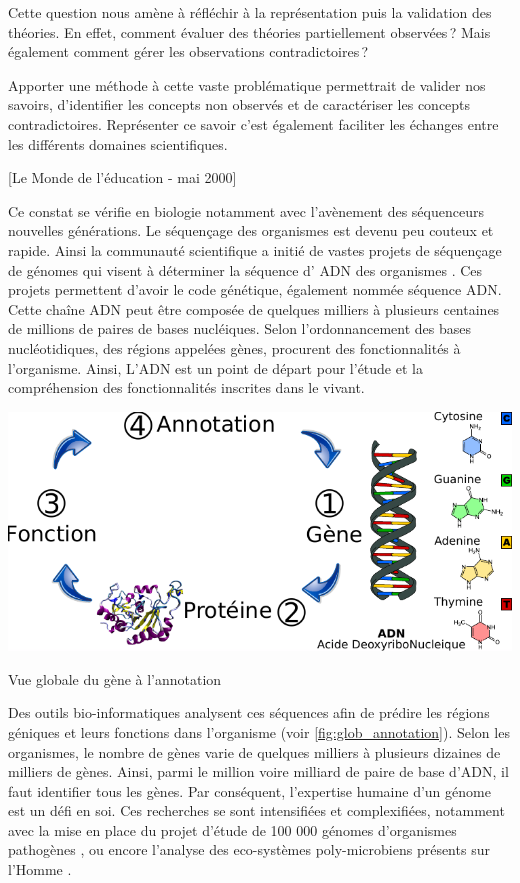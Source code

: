 \begin{refsegment}
Cette question nous amène à réfléchir à la représentation puis la validation des théories. En effet, comment évaluer des théories partiellement observées ? Mais également comment gérer les observations contradictoires ?

Apporter une méthode à cette vaste problématique permettrait de valider nos savoirs, d'identifier les concepts non observés et de caractériser les concepts contradictoires. Représenter ce savoir c'est également faciliter les échanges entre les différents domaines scientifiques.

[Le Monde de l'éducation - mai 2000]

Ce constat se vérifie en biologie notamment avec l'avènement des séquenceurs nouvelles générations. Le séquençage des organismes est devenu peu couteux et rapide. Ainsi la communauté scientifique a initié de vastes projets de séquençage de génomes qui visent à déterminer la séquence d' \gls{ADN} des organismes . Ces projets permettent d'avoir le code génétique, également nommée séquence \gls{ADN}. Cette chaîne \gls{ADN} peut être composée de quelques milliers à plusieurs centaines de millions de paires de bases nucléiques. Selon l'ordonnancement des bases nucléotidiques, des régions appelées gènes, procurent des fonctionnalités à l'organisme. Ainsi, L'\gls{ADN} est un point de départ pour l'étude et la compréhension des fonctionnalités inscrites dans le vivant.


\begin{shadedfigure}
    \centering
    \includegraphics{img/simple_annotation_process.pdf}
    \caption{Vue globale du gène à l'annotation }
    \label{fig:glob_annotation}
\end{shadedfigure}

Des outils bio-informatiques analysent ces séquences afin de prédire les régions géniques et leurs fonctions dans l'organisme (voir \cref{fig:glob_annotation}). Selon les organismes, le nombre de gènes varie de quelques milliers à plusieurs dizaines de milliers de gènes. Ainsi, parmi le million voire milliard de paire de base d'\gls{ADN}, il faut identifier tous les gènes. Par conséquent, l'expertise humaine d'un génome est un défi en soi. Ces recherches se sont intensifiées et complexifiées, notamment avec la mise en place du projet d'étude de 100 000 génomes d'organismes pathogènes \cite{100kfoodborne}, ou encore l'analyse des eco-systèmes poly-microbiens présents sur l'Homme \cite{hmp}.


\end{refsegment}
